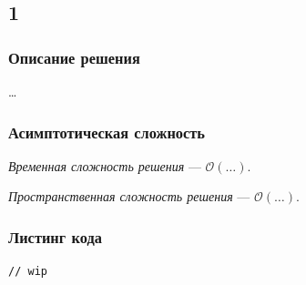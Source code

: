 \subsection{1}

\subsubsection{Описание решения}

\dots

\subsubsection{Асимптотическая сложность}

\textit{Временная сложность решения} --- \( \mathcal{O}(\dots) \).

\textit{Пространственная сложность решения} --- \( \mathcal{O}(\dots) \).

\subsubsection{Листинг кода}

\begin{lstlisting}
// wip
\end{lstlisting}